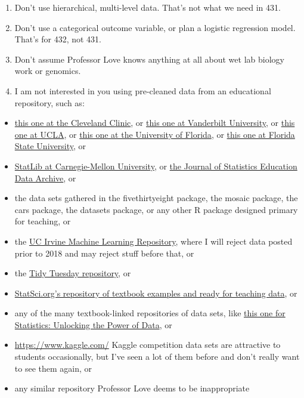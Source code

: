 \documentclass[]{book}
\providecommand{\tightlist}{%
  \setlength{\itemsep}{0pt}\setlength{\parskip}{0pt}}
\begin{document}
\begin{enumerate}
\def\labelenumi{\arabic{enumi}.}
\tightlist
\item
  Don't use hierarchical, multi-level data. That's not what we need in 431.
\item
  Don't use a categorical outcome variable, or plan a logistic regression model. That's for 432, not 431.
\item
  Don't assume Professor Love knows anything at all about wet lab biology work or genomics.
\item
  I am not interested in you using pre-cleaned data from an educational repository, such as:
\end{enumerate}

\begin{itemize}
\tightlist
\item
  \href{http://www.lerner.ccf.org/qhs/datasets/}{this one at the Cleveland Clinic}, or \href{http://biostat.mc.vanderbilt.edu/wiki/Main/DataSets}{this one at Vanderbilt University}, or \href{http://www.stat.ucla.edu/projects/datasets/}{this one at UCLA}, or \href{http://www.stat.ufl.edu/~winner/datasets.html}{this one at the University of Florida}, or \href{http://people.sc.fsu.edu/~jburkardt/datasets/datasets.html}{this one at Florida State University}, or
\item
  \href{http://lib.stat.cmu.edu/datasets/}{StatLib at Carnegie-Mellon University}, or \href{http://www.amstat.org/publications/jse/jse_data_archive.htm}{the Journal of Statistics Education Data Archive}, or
\item
  the data sets gathered in the fivethirtyeight package, the mosaic package, the cars package, the datasets package, or any other R package designed primary for teaching, or
\item
  the \href{https://archive.ics.uci.edu/ml/index.php}{UC Irvine Machine Learning Repository}, where I will reject data posted prior to 2018 and may reject stuff before that, or
\item
  the \href{https://github.com/rfordatascience/tidytuesday}{Tidy Tuesday repository}, or
\item
  \href{http://www.statsci.org/datasets.html}{StatSci.org's repository of textbook examples and ready for teaching data}, or
\item
  any of the many textbook-linked repositories of data sets, like \href{http://www.lock5stat.com/datapage.html}{this one for Statistics: Unlocking the Power of Data}, or
\item
  \url{https://www.kaggle.com/} Kaggle competition data sets are attractive to students occasionally, but I've seen a lot of them before and don't really want to see them again, or
\item
  any similar repository Professor Love deems to be inappropriate
\end{itemize}
\end{document}
